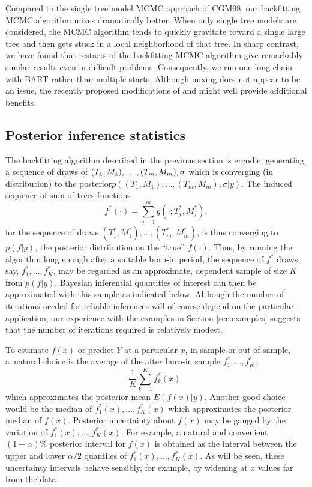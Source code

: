 \documentclass[aoas,nameyear,dvips]{arximspdf}
\newcommand{\citeasnoun}[1]{\citet{#1}}
\begin{document}
Compared to the single tree model MCMC approach of CGM98, our
backfitting MCMC algorithm mixes dramatically better.  When only
single tree models are considered, the MCMC algorithm tends to
quickly gravitate toward a single large tree and then gets stuck
in a local neighborhood of that tree. In sharp contrast, we have
found that restarts of the backfitting MCMC algorithm give
remarkably similar results even in difficult problems.
Consequently, we run one long chain with BART rather than multiple
starts.  Although mixing does not appear to be an issue, the
recently proposed modifications of \citeasnoun{Blan2004} and \citeasnoun{WuTjeWes2007}
might well provide additional benefits.

\subsection{Posterior inference statistics}\label{sec:estpd}


The backfitting algorithm described in the previous section is ergodic,
generating a sequence of draws of $(T_1,M_1),\break \ldots,(T_m, M_m),\sigma$
which is converging (in distribution) to the posterior\break $p((T_1,M_1),
\ldots,(T_m, M_m),\sigma |  y)$.  The induced sequence of sum-of-trees
functions
\begin{equation}\label{fstar}
f^*(\cdot) = \sum_{j=1}^m g(\cdot;T_j^*,M_j^*),
\end{equation}
for the sequence of draws $(T_1^*,M_1^*), \ldots,(T_m^*,M_m^*)$, is
thus converging to $p(f   |  y)$, the posterior distribution on the
``true'' $f(\cdot)$.  Thus, by running the algorithm long enough after
a suitable burn-in period, the sequence of $f^*$ draws, say,
$f^*_1,\dots,f^*_K$, may be regarded as an approximate, dependent
sample of size $K$ from $p(f   |  y)$.  Bayesian inferential quantities
of interest can then be approximated with this sample as indicated
below.  Although the number of iterations needed for reliable
inferences will of course depend on the particular application, our
experience with the examples in Section \ref{sec:examples} suggests
that the number of iterations required is relatively modest.

To estimate $f(x)$ or predict $Y$ at a particular $x$, in-sample or
out-of-sample, a~natural choice is the average of the after burn-in
sample  $f^*_1,\dots,f^*_K$,
\begin{equation}\label{eq:fhat}
\frac{1}{K} \sum_{k=1}^K f^*_k(x),
\end{equation}
which approximates the posterior mean $E( f(x)  |  y)$.    Another good
choice would be the median of $f^*_1(x),\dots,f^*_K(x)$ which
approximates the posterior median of $f(x)$.  Posterior uncertainty
about $f(x)$ may be gauged by the variation of
$f^*_1(x),\dots,f^*_K(x)$. For example, a natural and convenient
$(1-\alpha)\%$ posterior interval for $f(x)$ is obtained as the
interval between the upper and lower $\alpha/2$ quantiles of
$f^*_1(x),\dots,f^*_K(x)$. As will be seen, these uncertainty intervals
behave sensibly, for example, by widening at $x$ values far from the
data.
\end{document}
